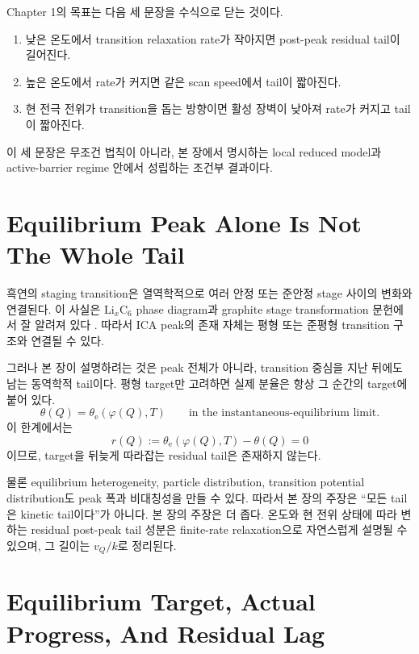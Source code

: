 \documentclass[11pt,a4paper]{article}
\begin{document}
Chapter 1의 목표는 다음 세 문장을 수식으로 닫는 것이다.

\begin{enumerate}
\item 낮은 온도에서 transition relaxation rate가 작아지면 post-peak residual tail이 길어진다.
\item 높은 온도에서 rate가 커지면 같은 scan speed에서 tail이 짧아진다.
\item 현 전극 전위가 transition을 돕는 방향이면 활성 장벽이 낮아져 rate가 커지고 tail이 짧아진다.
\end{enumerate}

이 세 문장은 무조건 법칙이 아니라, 본 장에서 명시하는 local reduced model과 active-barrier regime 안에서 성립하는 조건부 결과이다.

\section{Equilibrium Peak Alone Is Not The Whole Tail}

흑연의 staging transition은 열역학적으로 여러 안정 또는 준안정 stage 사이의 변화와 연결된다. 이 사실은 \( \mathrm{Li}_x\mathrm{C}_6\) phase diagram과 graphite stage transformation 문헌에서 잘 알려져 있다 \cite{Dahn1991,Funabiki1999}. 따라서 ICA peak의 존재 자체는 평형 또는 준평형 transition 구조와 연결될 수 있다.

그러나 본 장이 설명하려는 것은 peak 전체가 아니라, transition 중심을 지난 뒤에도 남는 동역학적 tail이다. 평형 target만 고려하면 실제 분율은 항상 그 순간의 target에 붙어 있다.
\begin{equation}
\theta(Q)=\theta_{\mathrm e}(\varphi(Q),T)
\qquad
\text{in the instantaneous-equilibrium limit}.
\end{equation}
이 한계에서는
\begin{equation}
r(Q):=\theta_{\mathrm e}(\varphi(Q),T)-\theta(Q)=0
\end{equation}
이므로, target을 뒤늦게 따라잡는 residual tail은 존재하지 않는다.

물론 equilibrium heterogeneity, particle distribution, transition potential distribution도 peak 폭과 비대칭성을 만들 수 있다. 따라서 본 장의 주장은 ``모든 tail은 kinetic tail이다''가 아니다. 본 장의 주장은 더 좁다. 온도와 현 전위 상태에 따라 변하는 residual post-peak tail 성분은 finite-rate relaxation으로 자연스럽게 설명될 수 있으며, 그 길이는 \(v_Q/k\)로 정리된다.

\section{Equilibrium Target, Actual Progress, And Residual Lag}
\end{document}
